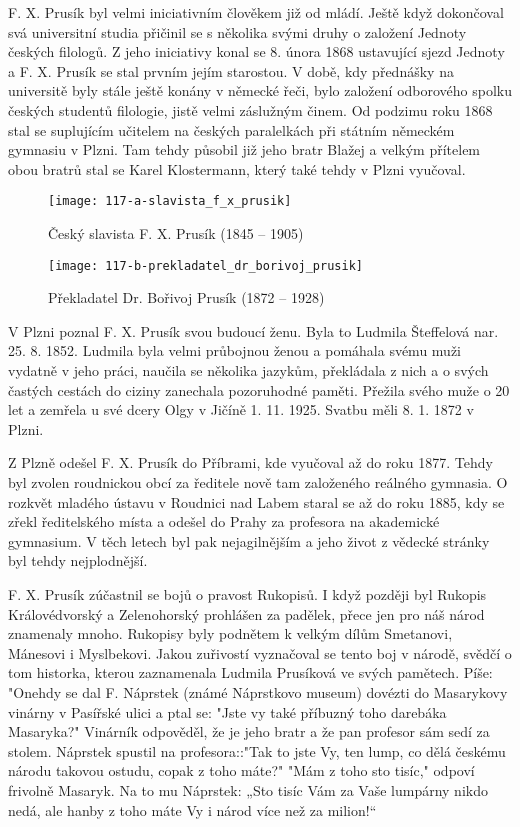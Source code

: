 \documentclass[../dejiny-rodu-prusiku.tex]{subfiles}
\begin{document}
F. X. Prusík byl velmi iniciativním člověkem již od mládí. Ještě když dokončoval svá universitní studia přičinil se s několika svými druhy o založení Jednoty českých filologů. Z jeho iniciativy konal se 8. února 1868 ustavující sjezd Jednoty a F. X. Prusík se stal prvním jejím starostou. V době, kdy přednášky na universitě byly stále ještě konány v německé řeči, bylo založení odborového spolku českých studentů filologie, jistě velmi záslužným činem.
Od podzimu roku 1868 stal se suplujícím učitelem na českých paralelkách při státním německém gymnasiu v Plzni. Tam tehdy působil již jeho bratr Blažej a velkým přítelem obou bratrů stal se Karel Klostermann, který také tehdy v Plzni vyučoval.

\begin{figure}
\centering
\texttt{[image: 117-a-slavista\_f\_x\_prusik]}
\caption{Český slavista F. X. Prusík (1845 – 1905)}
\label{fig:117-a-slavista_f_x_prusik}
\end{figure}

\begin{figure}
\centering
\texttt{[image: 117-b-prekladatel\_dr\_borivoj\_prusik]}
\caption{Překladatel Dr. Bořivoj Prusík (1872 – 1928)}
\label{fig:117-b-prekladatel_dr_borivoj_prusik}
\end{figure}


V Plzni poznal F. X. Prusík svou budoucí ženu. Byla to Ludmila Šteffelová nar. 25. 8. 1852. Ludmila byla velmi průbojnou ženou a pomáhala svému muži vydatně v jeho práci, naučila se několika jazykům, překládala z nich a o svých častých cestách do ciziny zanechala pozoruhodné paměti. Přežila svého muže o 20 let a zemřela u své dcery Olgy v Jičíně 1. 11. 1925. Svatbu měli 8. 1. 1872 v Plzni.

Z Plzně odešel F. X. Prusík do Příbrami, kde vyučoval až do roku 1877. Tehdy byl zvolen roudnickou obcí za ředitele nově tam založeného reálného gymnasia. O rozkvět mladého ústavu v Roudnici nad Labem staral se až do roku 1885, kdy se zřekl ředitelského místa a odešel do Prahy za profesora na akademické gymnasium. V těch letech byl pak nejagilnějším a jeho život z vědecké stránky byl tehdy nejplodnější.

F. X. Prusík zúčastnil se bojů o pravost Rukopisů. I když později byl Rukopis Královédvorský a Zelenohorský pro­hlášen za padělek, přece jen pro náš národ znamenaly mnoho. Rukopisy byly podnětem k velkým dílům Smetano­vi, Mánesovi i Myslbekovi. Jakou zuřivostí vyznačoval se tento boj v národě, svědčí o tom historka, kterou zaznamenala Ludmila Prusíková ve svých pamětech. Píše: "Onehdy se dal F. Náprstek (známé Náprstkovo museum) dovézti do Masarykovy vinárny v Pasířské ulici a ptal se: "Jste vy také příbuzný toho darebáka Masaryka?" Vinárník odpověděl, že je jeho bratr a že pan profesor sám sedí za stolem. Náprstek spustil na profesora::"Tak to jste Vy, ten lump, co dělá českému národu takovou ostudu, copak z toho máte?" "Mám z toho sto tisíc," odpoví frivolně Masaryk. Na to mu Náprstek: „Sto tisíc Vám za Vaše lum­párny nikdo nedá, ale hanby z toho máte Vy i národ více než za milion!“
\end{document}

